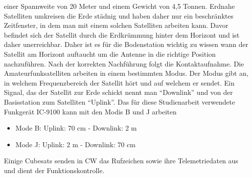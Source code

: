 einer Spannweite von 20 Meter und einem Gewicht von 4,5 Tonnen. Erdnahe Satelliten umkreisen die Erde städnig und haben daher nur ein beschränktes 
Zeitfenster, in dem man mit einem solchen Satelliten arbeiten kann. Davor befindet sich der Satellit durch die Erdkrümmung hinter dem Horizont und 
ist daher unerreichbar. Daher ist es für die Bodenstation wichtig zu wissen wann der Satellit am Horizont auftaucht um die Antenne in die richtige 
Position nachzuführen. Nach der korrekten Nachführung folgt die Kontaktaufnahme. Die Amateurfunksatelliten arbeiten in einem bestimmten Modus. 
Der Modus gibt an, in welchem Frequenzbereich der Satellit hört und auf welchem er sendet. Ein Signal,
das der Satellit zur Erde schickt nennt man ``Downlink'' und von der Basisstation zum Satelliten ``Uplink''. Das für diese Studienarbeit 
verwendete Funkgerät IC-9100 kann mit den Modis B und J arbeiten \cite[S.153]{radiomanual}
\begin{itemize}
 \item Mode B: Uplink: 70 cm - Downlink:  2  m 
 \item Mode J: Uplink:  2  m - Downlink: 70 cm
\end{itemize}
Einige Cubesats senden in \ac{CW} das Rufzeichen sowie ihre Telemetriedaten aus und dient der Funktionskontrolle.
\newpar
